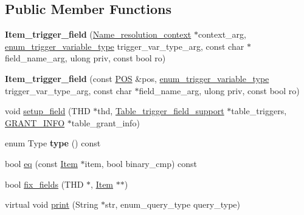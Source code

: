 \subsection*{Public Member Functions}
\begin{DoxyCompactItemize}
\item 
\mbox{\label{classItem__trigger__field_a110b88081b5be174af0a1bcd3461628a}} 
{\bfseries Item\+\_\+trigger\+\_\+field} (\mbox{\hyperlink{structName__resolution__context}{Name\+\_\+resolution\+\_\+context}} $\ast$context\+\_\+arg, \mbox{\hyperlink{trigger__def_8h_a21eb81babac229407b0b483596163bc2}{enum\+\_\+trigger\+\_\+variable\+\_\+type}} trigger\+\_\+var\+\_\+type\+\_\+arg, const char $\ast$field\+\_\+name\+\_\+arg, ulong priv, const bool ro)
\item 
\mbox{\label{classItem__trigger__field_aa469314d31cae522ca7f9eefa0732422}} 
{\bfseries Item\+\_\+trigger\+\_\+field} (const \mbox{\hyperlink{structYYLTYPE}{P\+OS}} \&pos, \mbox{\hyperlink{trigger__def_8h_a21eb81babac229407b0b483596163bc2}{enum\+\_\+trigger\+\_\+variable\+\_\+type}} trigger\+\_\+var\+\_\+type\+\_\+arg, const char $\ast$field\+\_\+name\+\_\+arg, ulong priv, const bool ro)
\item 
void \mbox{\hyperlink{classItem__trigger__field_a4d1d3c955aad1b680dbed2cbcca5b466}{setup\+\_\+field}} (T\+HD $\ast$thd, \mbox{\hyperlink{classTable__trigger__field__support}{Table\+\_\+trigger\+\_\+field\+\_\+support}} $\ast$table\+\_\+triggers, \mbox{\hyperlink{structGRANT__INFO}{G\+R\+A\+N\+T\+\_\+\+I\+N\+FO}} $\ast$table\+\_\+grant\+\_\+info)
\item 
\mbox{\label{classItem__trigger__field_a0eff546fadb24e6bf1f6df7f7d3a3c24}} 
enum Type {\bfseries type} () const
\item 
bool \mbox{\hyperlink{classItem__trigger__field_a8ad192808fbb5d42dbc49a0809355478}{eq}} (const \mbox{\hyperlink{classItem}{Item}} $\ast$item, bool binary\+\_\+cmp) const
\item 
bool \mbox{\hyperlink{classItem__trigger__field_ae8c6fff3b15e017433a9103bce570187}{fix\+\_\+fields}} (T\+HD $\ast$, \mbox{\hyperlink{classItem}{Item}} $\ast$$\ast$)
\item 
virtual void \mbox{\hyperlink{classItem__trigger__field_a68115abf242013d5b319a0c3c58c5384}{print}} (String $\ast$str, enum\+\_\+query\+\_\+type query\+\_\+type)
$$
\end{DoxyCompactItemize}
